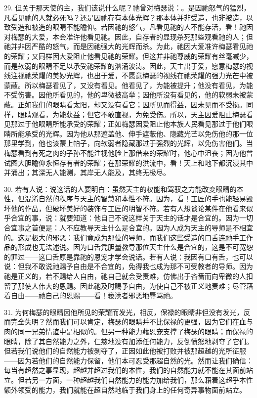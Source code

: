 29. 但关于那天使的主，我们该说什么呢？祂曾对梅瑟说：。是因祂怒气的猛烈，凡看见祂的人就必死吗？还是因祂存有本体光辉？那本体并非受造，也非被造，以致受造和被造的眼睛不能瞻仰。若因祂的怒气，凡看见祂的人不能存活，看！祂因对梅瑟的大爱，本会准许他看见祂。因此，自存者的显现杀死那些观看祂的人；但祂并非因严酷的怒气，而是因祂强大的光辉而杀。为此，祂因大爱准许梅瑟看见祂的荣耀；又同样因大爱阻止他看见祂的荣耀。但这并非祂尊威的荣耀有丝毫减少，而是软弱的眼睛不足以承受祂荣耀的汹涌波涛。因此，天主出于爱，愿意梅瑟的视线注视祂荣耀的美妙光辉，也出于爱，不愿意梅瑟的视线在祂荣耀的强力光芒中被蒙蔽。所以梅瑟看见了，又没有看见。他看见了，为能被提升；他没有看见，为能不受伤害。因他所看见的，他的卑微被高举；因他所没有看见的，他的软弱未被蒙蔽。正如我们的眼睛看太阳，却又没有看它；因所见而得益，因未见而不受损。同样，眼睛观看，为能获益；但它不敢直视，为免受伤。所以，天主因爱阻止梅瑟看见那过于他眼睛所能承受的荣耀；正如梅瑟因爱阻止他本族人民看见那过于他们眼睛所能承受的光辉。因为他从那遮盖他、伸手遮蔽他、隐藏光芒以免伤他的那一位那里学到，他也该蒙上帕子，向软弱者隐藏那过于强烈的光辉，以免伤害他们。当梅瑟看到有死之肉的子孙不能注视他脸上那借来的荣耀时，他心中沮丧；因为他曾试图大胆瞻仰永恒存有者的荣耀；在那荣耀的洪流中，看！天上和地下都沉浸其中并涌出；其深无人能测，其岸无人能及，其终无极尽。\par

30. 若有人说：说这话的人要明白：虽然天主的权能和驾驭之力能改变眼睛的本性，但混淆自然的秩序与天主的智慧和本性不符。因为，看！工匠的手也能轻易毁坏他的作品，但破坏美好的装饰与工匠的明智不符。若有人想谈论某件在他看来似乎合宜的事，说：就要知道：他自己不说这样关于天主的话才是合宜的。因为一切合宜事之首便是：人不应教导天主什么是合宜的。因为人成为天主的导师是不相宜的。这是极大的邪恶：我们竟成为那位的导师，而我们这些受造的口舌连祂手工作品的形成也无法述说。因为口舌凭胆量教导那位天主什么是合宜的，这是不可宽恕的罪过——这口舌原是靠祂的恩宠才学会说话。若有人说：我因有口有舌，也可以说：但我不敢说祂赐予自由是不合宜的，免得我也成为那不可受教者的导师。因为祂是正义的，若不赐给人自由，祂自己就会受责难，仿佛出于吝啬而向卑微的人扣留了那使人伟大的恩赐。因此祂及时赐予自由，为使自己不被正义地责难；尽管藉着自由——祂自己的恩赐——看！亵渎者邪恶地辱骂祂。\par

31. 为何梅瑟的眼睛因他所见的荣耀而发光，相反，保禄的眼睛非但没有发光，反而完全失明？然而我们可以肯定，梅瑟的眼睛并不比保禄的更强，因为它们在血与肉的同一兄弟情谊中是相似的。但另一种能力藉恩宠支撑了梅瑟的眼睛；而保禄的眼睛，除了其自然能力之外，仁慈地没有加添任何能力，反倒愤怒地剥夺了它们。但若我们说他们的自然能力被剥夺了，正因如此他被打败并被那超越的光所征服——因为若他们的自然能力保留，他们本可忍受那超自然的光。然而让我们确信：每当有超然之事显现，超越并超过我们的本性，我们的自然能力就不能在其面前站立。但若另一方面，一种超越我们自然能力的能力加给我们，那么藉着这超乎本性额外领受的能力，我们就能在超自然地临于我们身上的任何奇异事物面前站立。\par

